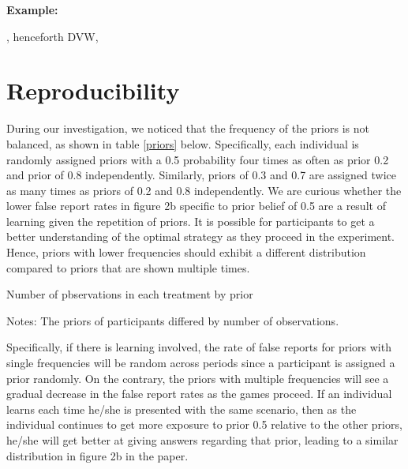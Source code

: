 \documentclass[12pt,a4paper]{article}
\begin{document}
	
	\textbf{Example:} 
	
	\cite{analyst_2022}, henceforth DVW, 
	
	
	\section{Reproducibility}
	
	During our investigation, we noticed that the frequency of the priors is not balanced, as shown in table \ref{priors} below. Specifically, each individual is randomly assigned priors with a 0.5 probability four times as often as prior 0.2 and prior of 0.8 independently. Similarly, priors of 0.3 and 0.7 are assigned twice as many times as priors of 0.2 and 0.8 independently. We are curious whether the lower false report rates in figure 2b specific to prior belief of 0.5 are a result of learning given the repetition of priors. It is possible for participants to get a better understanding of the optimal strategy as they proceed in the experiment. Hence, priors with lower frequencies should exhibit a different distribution compared to priors that are shown multiple times.
	
	\begin{table}[H]
		\centering
		\caption{Number of pbservations in each treatment by prior} \label{tab:table1}
		\begin{threeparttable}
			\footnotesize 
			 
			\begin{tablenotes}
				\scriptsize 
				\item{Notes: The priors of participants differed by number of observations.
				}
			\end{tablenotes}  
		\end{threeparttable}                          
	\end{table} \label{priors}
	
	
	\hspace *{0mm} Specifically, if there is learning involved, the rate of false reports for priors with single frequencies will be random across periods since a participant is assigned a prior randomly. On the contrary, the priors with multiple frequencies will see a gradual decrease in the false report rates as the games proceed. If an individual learns each time he/she is presented with the same scenario, then as the individual continues to get more exposure to prior 0.5 relative to the other priors, he/she will get better at giving answers regarding that prior, leading to a similar distribution in figure 2b in the paper.
	
\end{document}
